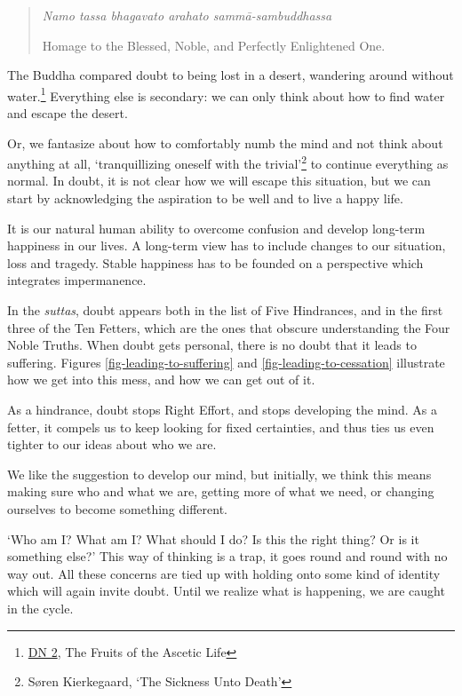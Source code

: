 \begin{quote}
\emph{Namo tassa bhagavato arahato sammā-sambuddhassa}

Homage to the Blessed, Noble, and Perfectly Enlightened One.
\end{quote}


The Buddha compared doubt to being lost in a desert, wandering around
without water.\footnote{\href{https://suttacentral.net/dn2}{DN 2}, The
  Fruits of the Ascetic Life} Everything else is secondary: we can only
think about how to find water and escape the desert.

Or, we fantasize about how to comfortably numb the mind and not think
about anything at all, `tranquillizing oneself with the
trivial'\footnote{Søren Kierkegaard, `The Sickness Unto Death'} to
continue everything as normal. In doubt, it is not clear how we will
escape this situation, but we can start by acknowledging the aspiration
to be well and to live a happy life.

It is our natural human ability to overcome confusion and develop
long-term happiness in our lives. A long-term view has to include
changes to our situation, loss and tragedy. Stable happiness has to be
founded on a perspective which integrates impermanence.

In the \emph{suttas}, doubt appears both in the list of Five Hindrances,
and in the first three of the Ten Fetters, which are the ones that
obscure understanding the Four Noble Truths. When doubt gets personal,
there is no doubt that it leads to suffering. Figures
\ref{fig-leading-to-suffering} and \ref{fig-leading-to-cessation}
illustrate how we get into this mess, and how we can get out of it.

As a hindrance, doubt stops Right Effort, and stops developing the mind.
As a fetter, it compels us to keep looking for fixed certainties, and
thus ties us even tighter to our ideas about who we are.

We like the suggestion to develop our mind, but initially, we think this
means making sure who and what we are, getting more of what we need, or
changing ourselves to become something different.

`Who am I? What am I? What should I do? Is this the right thing? Or is
it something else?' This way of thinking is a trap, it goes round and
round with no way out. All these concerns are tied up with holding onto
some kind of identity which will again invite doubt. Until we realize
what is happening, we are caught in the cycle.

